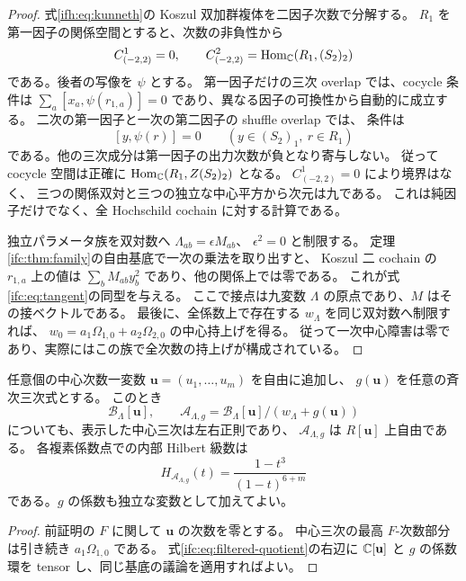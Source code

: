 \begin{proof}
式\eqref{ifh:eq:kunneth}の Koszul 双加群複体を二因子次数で分解する。
$R_1$ を第一因子の関係空間とすると、次数の非負性から
\[
 C^1_{(-2,2)}=0,\qquad
 C^2_{(-2,2)}=\operatorname{Hom}_\mathbb C(R_1,(S_2)_2)
\]
である。後者の写像を $\psi$ とする。
第一因子だけの三次 overlap では、cocycle 条件は
$\sum_a[x_a,\psi(r_{1,a})]=0$ であり、異なる因子の可換性から自動的に成立する。
二次の第一因子と一次の第二因子の shuffle overlap では、
条件は
\[
                [y,\psi(r)]=0
             \qquad(y\in(S_2)_1,\ r\in R_1)
\]
である。他の三次成分は第一因子の出力次数が負となり寄与しない。
従って cocycle 空間は正確に
$\operatorname{Hom}_\mathbb C(R_1,Z(S_2)_2)$ となる。
$C^1_{(-2,2)}=0$ により境界はなく、
三つの関係双対と三つの独立な中心平方から次元は九である。
これは純因子だけでなく、全 Hochschild cochain に対する計算である。

独立パラメータ族を双対数へ $\Lambda_{ab}=\epsilon M_{ab}$、
$\epsilon^2=0$ と制限する。
定理\ref{ifc:thm:family}の自由基底で一次の乗法を取り出すと、
Koszul 二 cochain の $r_{1,a}$ 上の値は
$\sum_bM_{ab}y_b^2$ であり、他の関係上では零である。
これが式\eqref{ifc:eq:tangent}の同型を与える。
ここで接点は九変数 $\Lambda$ の原点であり、$M$ はその接ベクトルである。
最後に、全係数上で存在する $w_\Lambda$ を同じ双対数へ制限すれば、
$w_0=a_1\Omega_{1,0}+a_2\Omega_{2,0}$ の中心持上げを得る。
従って一次中心障害は零であり、実際にはこの族で全次数の持上げが構成されている。
\end{proof}

\begin{corollary}[自由な中心変数の追加]
\label{ifc:cor:central-variables}
任意個の中心次数一変数 $\mathbf u=(u_1,\ldots,u_m)$ を自由に追加し、
$g(\mathbf u)$ を任意の斉次三次式とする。
このとき
\[
 \mathcal B_\Lambda[\mathbf u],\qquad
 \mathcal A_{\Lambda,g}
   =\mathcal B_\Lambda[\mathbf u]/
       (w_\Lambda+g(\mathbf u))
\]
についても、表示した中心三次は左右正則であり、
$\mathcal A_{\Lambda,g}$ は $R[\mathbf u]$ 上自由である。
各複素係数点での内部 Hilbert 級数は
\[
              H_{\mathcal A_{\Lambda,g}}(t)
                       =\frac{1-t^3}{(1-t)^{6+m}}
\]
である。$g$ の係数も独立な変数として加えてよい。
\end{corollary}

\begin{proof}
前証明の $F$ に関して $\mathbf u$ の次数を零とする。
中心三次の最高 $F$-次数部分は引き続き $a_1\Omega_{1,0}$ である。
式\eqref{ifc:eq:filtered-quotient}の右辺に
$\mathbb C[\mathbf u]$ と $g$ の係数環を tensor し、同じ基底の議論を適用すればよい。
\end{proof}

